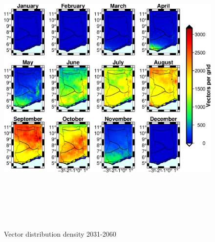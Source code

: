 \documentclass[utf8]{FrontiersinHarvard} %
\begin{document}
\begin{figure}[ht]
\begin{center}
\includegraphics[width=15cm,height=15cm]{vector_MPI-M-MPI-ESM-LR_rcp26_2031-2060_biascorrected.eps}
\caption{Vector distribution density 2031-2060}
\label{fig:3:6}
\end{center}
\end{figure}
\end{document}
